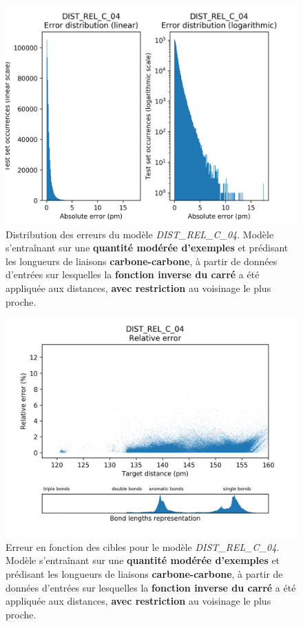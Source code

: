 \begin{figure}[!h]
	\centering
	
	\includegraphics[scale=0.75]{../figures/DIST_REL_C_04/DIST_REL_C_04_distrib_rmse_val.png}	
	
	\caption{Distribution des erreurs du modèle \emph{DIST\_REL\_C\_04}. Modèle s'entraînant sur une \textbf{quantité modérée d'exemples} et prédisant les longueurs de liaisons \textbf{carbone-carbone}, à partir de données d'entrées sur lesquelles la \textbf{fonction inverse du carré} a été appliquée aux distances, \textbf{avec restriction} au voisinage le plus proche.}
\end{figure}
\begin{figure}[!h]
	\centering
	
	\includegraphics[scale=0.75]{../figures/DIST_REL_C_04/DIST_REL_C_04_distrib_rmse_dist.png}	
	
	\caption{Erreur en fonction des cibles pour le modèle \emph{DIST\_REL\_C\_04}. Modèle s'entraînant sur une \textbf{quantité modérée d'exemples} et prédisant les longueurs de liaisons \textbf{carbone-carbone}, à partir de données d'entrées sur lesquelles la \textbf{fonction inverse du carré} a été appliquée aux distances, \textbf{avec restriction} au voisinage le plus proche.}
	\end{figure}

